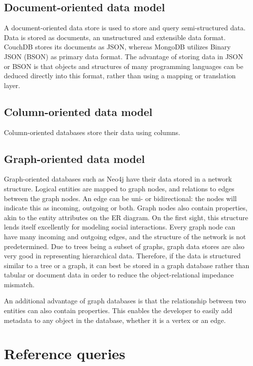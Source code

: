 \subsection{Document-oriented data model}
\label{sec:document-data-model}

A document-oriented data store is used to store and query semi-structured data. Data is stored as documents, an unstructured and extensible data format. CouchDB stores its documents as JSON, whereas MongoDB utilizes Binary JSON (BSON) as primary data format. The advantage of storing data in JSON or BSON is that objects and structures of many programming languages can be deduced directly into this format, rather than using a mapping or translation layer.

\subsection{Column-oriented data model}
\label{sec:column-data-model}

Column-oriented databases store their data using columns.

\subsection{Graph-oriented data model}
\label{sec:graph-data-model}

Graph-oriented databases such as Neo4j have their data stored in a network structure. Logical entities are mapped to graph nodes, and relations to edges between the graph nodes. An edge can be uni- or bidirectional: the nodes will indicate this as incoming, outgoing or both. Graph nodes also contain properties, akin to the entity attributes on the ER diagram.
On the first sight, this structure lends itself excellently for modeling social interactions. Every graph node can have many incoming and outgoing edges, and the structure of the network is not predetermined.
Due to trees being a subset of graphs, graph data stores are also very good in representing hierarchical data. Therefore, if the data is structured similar to a tree or a graph, it can best be stored in a graph database rather than tabular or document data in order to reduce the object-relational impedance mismatch.

An additional advantage of graph databases is that the relationship between two entities can also contain properties. This enables the developer to easily add metadata to any object in the database, whether it is a vertex or an edge.

\section{Reference queries}
\label{sec:reference-queries}

